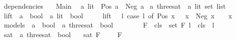 %
\begin{isabellebody}%
%
%
\isadelimtheory
%
\endisadelimtheory
%
\isatagtheory
{}\isamarkupfalse%
\ dependencies\isanewline
\ \ \ Main\ \isanewline
\isanewline
{}%
\endisatagtheory
{\isafoldtheory}%
%
\isadelimtheory
\isanewline
%
\endisadelimtheory
{}\isamarkupfalse%
\ {\isacharprime}{\kern0pt}a\ lit\ {\isacharequal}{\kern0pt}\ Pos\ {\isacharprime}{\kern0pt}a\ {\isacharbar}{\kern0pt}\ Neg\ {\isacharprime}{\kern0pt}a\isanewline
\isanewline
{}\isamarkupfalse%
\ {\isacharprime}{\kern0pt}a\ three{\isacharunderscore}{\kern0pt}sat\ {\isacharequal}{\kern0pt}\ {\isachardoublequoteopen}{\isacharprime}{\kern0pt}a\ lit\ set\ list{\isachardoublequoteclose}\isanewline
\isanewline
{}\isamarkupfalse%
\ lift\ {\isacharcolon}{\kern0pt}{\isacharcolon}{\kern0pt}\ {\isachardoublequoteopen}{\isacharparenleft}{\kern0pt}{\isacharprime}{\kern0pt}a\ {\isasymRightarrow}\ bool{\isacharparenright}{\kern0pt}\ {\isasymRightarrow}\ {\isacharprime}{\kern0pt}a\ lit\ {\isasymRightarrow}\ bool{\isachardoublequoteclose}\ {\isacharparenleft}{\kern0pt}{\isachardoublequoteopen}{\isacharunderscore}{\kern0pt}{\isasymup}{\isachardoublequoteclose}\ {}{}{\isacharparenright}{\kern0pt}\ \isanewline
\ \ {\isachardoublequoteopen}lift\ {\isasymsigma}\ {\isasymequiv}\ {\isasymlambda}l{\isachardot}{\kern0pt}\ case\ l\ of\ Pos\ x\ {\isasymRightarrow}\ {\isasymsigma}\ x\ {\isacharbar}{\kern0pt}\ Neg\ x\ {\isasymRightarrow}\ {\isasymnot}\ {\isasymsigma}\ x{\isachardoublequoteclose}\isanewline
\isanewline
{}\isamarkupfalse%
\ models\ {\isacharcolon}{\kern0pt}{\isacharcolon}{\kern0pt}\ {\isachardoublequoteopen}{\isacharparenleft}{\kern0pt}{\isacharprime}{\kern0pt}a\ {\isasymRightarrow}\ bool{\isacharparenright}{\kern0pt}\ {\isasymRightarrow}\ {\isacharprime}{\kern0pt}a\ three{\isacharunderscore}{\kern0pt}sat\ {\isasymRightarrow}\ bool{\isachardoublequoteclose}\ {\isacharparenleft}{\kern0pt}\ {\isachardoublequoteopen}{\isasymTurnstile}{\isachardoublequoteclose}\ {}{}{\isacharparenright}{\kern0pt}\ \isanewline
\ \ {\isachardoublequoteopen}{\isasymsigma}\ {\isasymTurnstile}\ F\ {\isasymequiv}\ {\isasymforall}cls\ {\isasymin}\ set\ F{\isachardot}{\kern0pt}\ {\isasymexists}l\ {\isasymin}\ cls{\isachardot}{\kern0pt}\ {\isacharparenleft}{\kern0pt}{\isasymsigma}{\isasymup}{\isacharparenright}{\kern0pt}\ l{\isachardoublequoteclose}\isanewline
\isanewline
{}\isamarkupfalse%
\ sat\ {\isacharcolon}{\kern0pt}{\isacharcolon}{\kern0pt}\ {\isachardoublequoteopen}{\isacharprime}{\kern0pt}a\ three{\isacharunderscore}{\kern0pt}sat\ {\isasymRightarrow}\ bool{\isachardoublequoteclose}\ \isanewline
\ \ {\isachardoublequoteopen}sat\ F\ {\isasymequiv}\ {\isasymexists}{\isasymsigma}{\isachardot}{\kern0pt}\ {\isasymsigma}\ {\isasymTurnstile}\ F{\isachardoublequoteclose}\isanewline
%
\isadelimtheory
\isanewline
%
\endisadelimtheory
%
\isatagtheory
{}\isamarkupfalse%
%
\endisatagtheory
{\isafoldtheory}%
%
\isadelimtheory
%
\endisadelimtheory
%
\end{isabellebody}%
